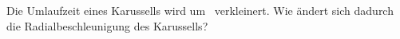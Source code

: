 Die Umlaufzeit eines Karussells wird um \pkO\ verkleinert. Wie ändert sich dadurch die Radialbeschleunigung des Karussells?
